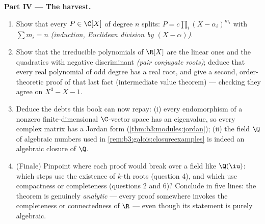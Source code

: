 \begin{problem}
\medskip
\noindent\textbf{Part IV --- The harvest.}
\begin{enumerate}[resume]
  \item Show that every $P \in \C[X]$ of degree $n$ splits:
        $P = c\prod_{i}(X - \alpha_i)^{m_i}$ with $\sum m_i =
        n$ \emph{(induction, Euclidean division by $(X -
        \alpha)$)}.
  \item Show that the irreducible polynomials of $\R[X]$ are
        the linear ones and the quadratics with negative
        discriminant \emph{(pair conjugate roots)}; deduce
        that every real polynomial of odd degree has a real
        root, and give a second, order-theoretic proof of
        that last fact (intermediate value theorem) ---
        checking they agree on $X^3 - X - 1$.
  \item Deduce the debts this book can now repay: (i) every
        endomorphism of a nonzero finite-dimensional
        $\C$-vector space has an eigenvalue, so every complex
        matrix has a Jordan form
        (\cref{thm:b3:modules:jordan}); (ii) the field
        $\bar\Q$ of algebraic numbers used in
        \cref{rem:b3:galois:closureexamples} is indeed an
        algebraic closure of $\Q$.
  \item (Finale) Pinpoint where each proof would break over a
        field like $\Q(\iu)$: which steps use the existence of
        $k$-th roots (question 4), and which use compactness
        or completeness (questions 2 and 6)? Conclude in five
        lines: the theorem is genuinely \emph{analytic} ---
        every proof somewhere invokes the completeness or
        connectedness of $\R$ --- even though its statement is
        purely algebraic.
\end{enumerate}


\end{problem}

